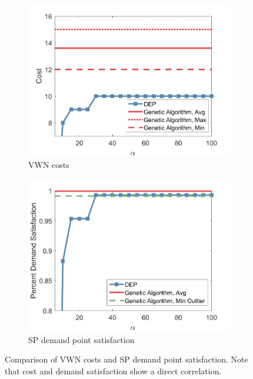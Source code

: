 \documentclass[conference]{IEEEtran}
\begin{document}
\begin{figure}
\centering
\begin{subfigure}{.45\textwidth}
	\centering
	\includegraphics[width=1\linewidth]{Figures/ComparisonCost}
	\caption{VWN costs}
	\label{fig:VWNCompCost}
\end{subfigure}
\hspace{0.5cm}
\begin{subfigure}{.45\textwidth}
	\centering
	\includegraphics[width=1\linewidth]{Figures/ComparisonSatisfaction}
	\caption{SP demand point satisfaction}
	\label{fig:VWNCompSatis}
\end{subfigure}
\caption{Comparison of VWN costs and SP demand point satisfaction.  Note that cost and demand satisfaction show a direct correlation.}
\label{fig:VWNComp}
\end{figure}
\end{document}

